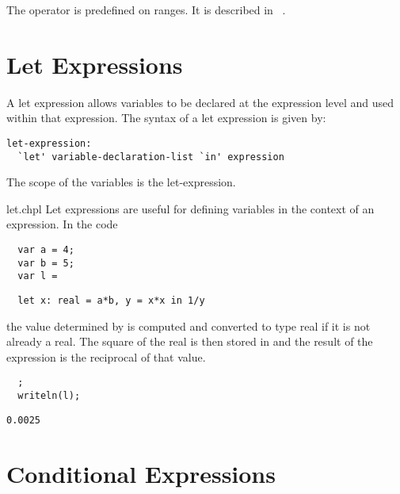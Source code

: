The operator \chpl{\#} is predefined on ranges. It is described
in ~.

\section{Let Expressions}
\label{Let_Expressions}

A let expression allows variables to be declared at the expression
level and used within that expression.  The syntax of a let expression
is given by:
\begin{syntax}
\begin{verbatim}
let-expression:
  `let' variable-declaration-list `in' expression
\end{verbatim}
\end{syntax}
The scope of the variables is the let-expression.
\begin{chapelexample}{let.chpl}
Let expressions are useful for defining variables in the context of
an expression.  In the code
\begin{chapelnoprint}
\begin{verbatim}
  var a = 4;
  var b = 5;
  var l =
\end{verbatim}
\end{chapelnoprint}
\begin{chapel}
\begin{verbatim}
  let x: real = a*b, y = x*x in 1/y
\end{verbatim}
\end{chapel}
the value determined by  is computed and converted to type
real if it is not already a real.  The square of the real is then
stored in  and the result of the expression is the reciprocal
of that value.
\begin{chapelnoprint}
\begin{verbatim}
  ;
  writeln(l);
\end{verbatim}
\end{chapelnoprint}
\begin{chapeloutput}
\begin{verbatim}
0.0025
\end{verbatim}
\end{chapeloutput}
\end{chapelexample}

\section{Conditional Expressions}
\label{Conditional_Expressions}

